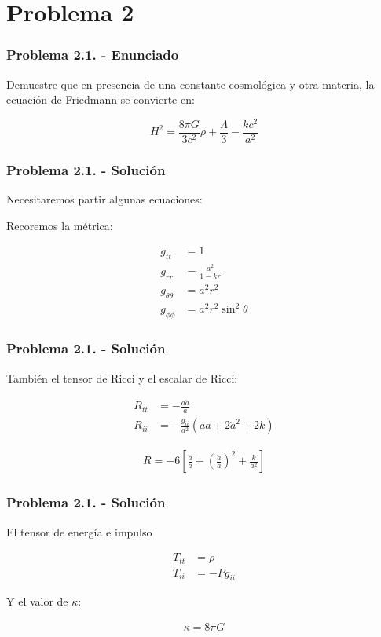 \section{Problema 2}

\begin{frame}
    \frametitle{Problema 2.1. - Enunciado}

    Demuestre que en presencia de una constante cosmológica y otra materia, la ecuación de Friedmann se convierte en:

    \begin{equation}
        H^2=\frac{8\pi G}{3c^2}\rho + \frac{\Lambda}{3} - \frac{kc^2}{a^2}
        \label{eq:H2mood}
    \end{equation}

\end{frame}

\begin{frame}
    \frametitle{Problema 2.1. - Solución}

    Necesitaremos partir algunas ecuaciones:

    Recoremos la métrica:

    \begin{align}
        g_{tt}&=1\label{eq:gtt}\\
        g_{rr}&=\frac{a^2}{1-kr}\\
        g_{\theta\theta}&=a^2r^2\\
        g_{\phi\phi}&=a^2r^2\sin^2\theta
    \end{align}

\end{frame}

\begin{frame}
    \frametitle{Problema 2.1. - Solución}

    También el tensor de Ricci y el escalar de Ricci:

    \begin{align}
        R_{tt}&=-\frac{a\ddot{a}}{a}\\
        R_{ii}&=-\frac{g_{ii}}{a^2}\left(a\ddot{a}+2\dot{a}^2+2k\right)
    \end{align}

    \begin{align}
        R = -6\left[\frac{\ddot{a}}{a}+\left(\frac{\dot{a}}{a}\right)^2+\frac{k}{a^2}\right]
    \end{align}

\end{frame}

\begin{frame}
    \frametitle{Problema 2.1. - Solución}

    El tensor de energía e impulso

    \begin{align}
        T_{tt}&=\rho\\
        T_{ii}&=-Pg_{ii}
    \end{align}

    Y el valor de $\kappa$:

    \begin{align}
        \kappa = 8\pi G\label{eq:kappa}
    \end{align}

\end{frame}

